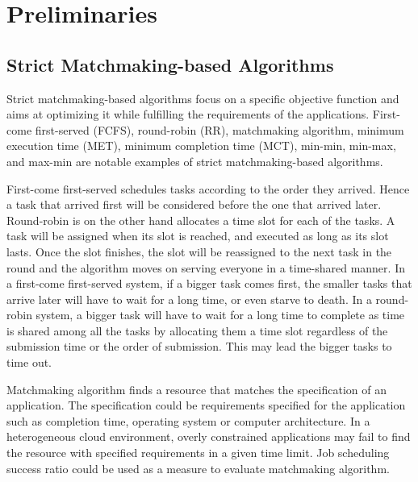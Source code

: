 \documentclass{llncs}
\begin{document}

\section{Preliminaries}

\subsection{Strict Matchmaking-based Algorithms}
Strict matchmaking-based algorithms focus on a specific objective function and aims at optimizing it while fulfilling the requirements of the applications. First-come first-served (FCFS), round-robin (RR), matchmaking algorithm, minimum execution time (MET), minimum completion time (MCT), min-min, min-max, and max-min\cite{heuristics} are notable examples of strict matchmaking-based algorithms.

First-come first-served schedules tasks according to the order they arrived\cite{lee}. Hence a task that arrived first will be considered before the one that arrived later. Round-robin is on the other hand allocates a time slot for each of the tasks. A task will be assigned when its slot is reached, and executed as long as its slot lasts. Once the slot finishes, the slot will be reassigned to the next task in the round and the algorithm moves on serving everyone in a time-shared manner\cite{ast}. In a first-come first-served system, if a bigger task comes first, the smaller tasks that arrive later will have to wait for a long time, or even starve to death. In a round-robin system, a bigger task will have to wait for a long time to complete as time is shared among all the tasks by allocating them a time slot regardless of the submission time or the order of submission. This may lead the bigger tasks to time out.

Matchmaking algorithm finds a resource that matches the specification of an application. The specification could be requirements specified for the application such as completion time, operating system or computer architecture. In a heterogeneous cloud environment, overly constrained applications may fail to find the resource with specified requirements in a given time limit. Job scheduling success ratio could be used as a measure to evaluate matchmaking algorithm.
\end{document}
